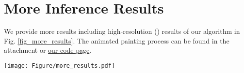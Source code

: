 \documentclass[10pt,twocolumn,letterpaper]{article}
\begin{document}
\section{More Inference Results}
We provide more results including high-resolution () results of our algorithm in Fig. \ref{fig_more_results}. 
The animated painting process can be found in the attachment or \href{https://github.com/Huage001/PaintTransformer}{our code page}.

\begin{figure*}[b]
\begin{center}
\texttt{[image: Figure/more\_results.pdf]}
\end{center}
\caption{More inference result.}
\label{fig_more_results}
\end{figure*}
\end{document}
